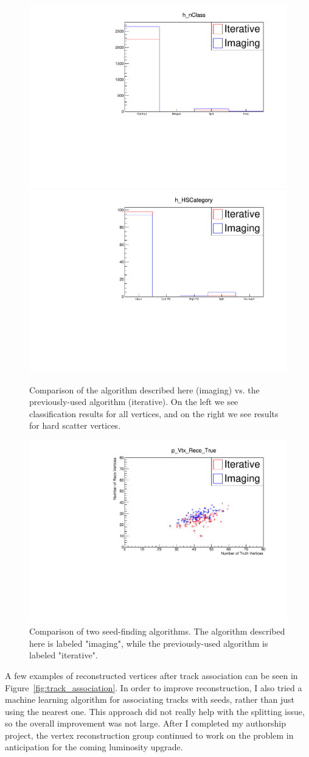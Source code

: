 \begin{figure}[H]
    \centering
    \includegraphics[width=0.45\linewidth]{Images/Other/h_nClass.pdf}
    \includegraphics[width=0.45\linewidth]{Images/Other/h_HSCategory.pdf}
    \caption{Comparison of the algorithm described here (imaging) vs. the previously-used algorithm (iterative). On the left we see classification results for all vertices, and on the right we see results for hard scatter vertices.}
    \label{fig:seed_method_compare}
\end{figure}

\begin{figure}[htbp]
    \centering
    \includegraphics[width=0.7\linewidth]{Images/Other/p_Vtx_Reco_True.pdf}
    \caption{Comparison of two seed-finding algorithms. The algorithm described here is labeled "imaging", while the previously-used algorithm is labeled "iterative".}
    \label{fig:vertices_compare}
\end{figure}

A few examples of reconstructed vertices after track association can be seen in Figure~\ref{fig:track_association}. In order to improve reconstruction, I also tried a machine learning algorithm for associating tracks with seeds, rather than just using the nearest one. This approach did not really help with the splitting issue, so the overall improvement was not large. After I completed my authorship project, the vertex reconstruction group continued to work on the problem in anticipation for the coming luminosity upgrade.

